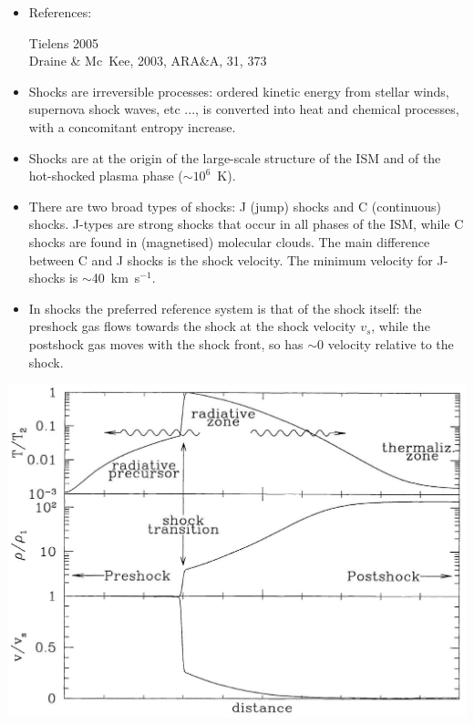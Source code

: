 \begin{itemize}

\item References: 

Tielens 2005\\ Draine \& Mc~Kee, 2003, ARA\&A, 31, 373 \\


\item Shocks are irreversible processes: ordered kinetic energy from
  stellar winds, supernova shock waves, etc ..., is converted into
  heat and chemical processes, with a concomitant entropy increase.

\item Shocks are at the origin of the large-scale structure of the ISM
  and of the hot-shocked plasma phase ($\sim 10^{6}$~K). 

\item There are two broad types of shocks: J (jump) shocks and C
(continuous) shocks. J-types are strong shocks that occur in all
phases of the ISM, while C shocks are found in (magnetised) molecular
clouds. The main difference between C and J shocks is the shock
velocity. The minimum velocity for J-shocks is $\sim$40~km~s$^{-1}$.

\end{itemize}



\begin{itemize}

\item In shocks the preferred reference system is that of the shock
  itself: the preshock gas flows towards the shock at the shock
  velocity $v_s$, while the postshock gas moves with the shock front,
  so has $\sim 0$ velocity relative to the shock. 


\end{itemize}

\begin{center}
  \includegraphics[width=14cm,height=!]{./E/fig_Jshocks.jpg}
\end{center}

